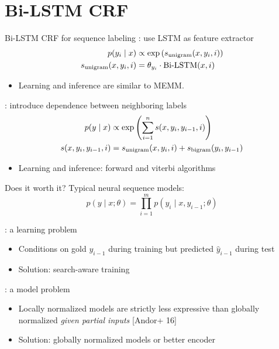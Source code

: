 \documentclass[usenames,dvipsnames,notes,11pt,aspectratio=169]{beamer}
\newcommand{\pdfnote}[1]{}
\begin{document}
\section{Bi-LSTM CRF}

\begin{frame}
    {Bi-LSTM CRF for sequence labeling}
    : use LSTM as feature extractor
    \begin{align*}
    p(y_i \mid x) &\propto \exp\left( s_{\text{unigram}}(x, y_i, i) \right) \\
        s_{\text{unigram}}(x, y_i, i) &= \theta_{y_i} \cdot \text{Bi-LSTM}(x, i)
    \end{align*}
    \vspace{-2em}
    \begin{itemize}
        \item Learning and inference are similar to MEMM.
    \end{itemize}

    : introduce dependence between neighboring labels
    \begin{align*}
        p(y \mid x) &\propto \exp\left( \sum_{i=1}^n s(x, y_i, y_{i-1}, i) \right) \\
        s(x, y_i, y_{i-1}, i) &= s_{\text{unigram}}(x, y_i, i) + s_{\text{bigram}}(y_i, y_{i-1})
    \end{align*}
    \vspace{-2em}
    \begin{itemize}
        \item Learning and inference: forward and viterbi algorithms
    \end{itemize}
\end{frame}

\begin{frame}
    {Does it worth it?}
    Typical neural sequence models:
    $$
    p(y\mid x;\theta) = \prod_{i=1}^m p(y_i\mid x, y_{i-1};\theta)
    $$

    : a learning problem\\
    \begin{itemize}
        \item Conditions on gold $y_{i-1}$ during training but predicted $\hat{y}_{i-1}$ during test
        \item Solution: search-aware training
            \pdfnote{Consider possible search errors during decoding. Only relevant when using inexact search.}
    \end{itemize}

    : a model problem\\
    \begin{itemize}
        \item Locally normalized models are strictly less expressive than globally normalized \textit{given partial inputs} [Andor+ 16]
        \item Solution: globally normalized models or better encoder
    \end{itemize}

\end{frame}
\end{document}
